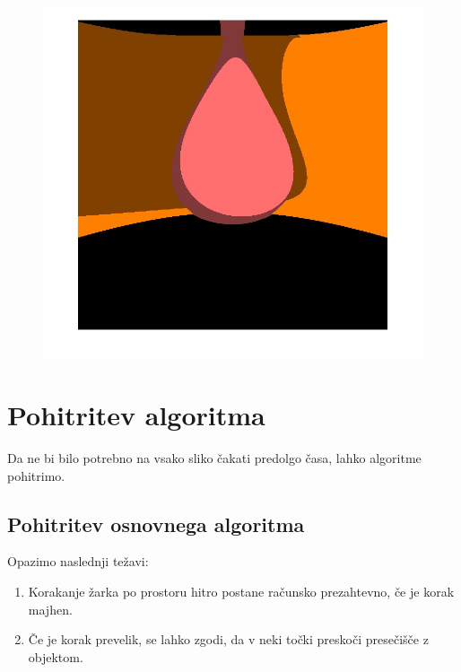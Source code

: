 \documentclass[titlepage]{article}
\begin{document}
\begin{figure}[H]
\begin{minipage}[t]{.33\textwidth}
  \label{fig:Flat torus render}
\end{minipage}
\begin{minipage}[t]{.33\textwidth}
  \centering
  \includegraphics[width=1\linewidth]{Images/2Sphere.jpg}
  \label{fig:2Sphere render}
\end{minipage}
\end{figure}


\newpage
\section{Pohitritev algoritma}
Da ne bi bilo potrebno na vsako sliko čakati predolgo časa, lahko algoritme pohitrimo. 

\subsection{Pohitritev osnovnega algoritma}
\label{subsec:pohitren_algoritem}
Opazimo naslednji težavi: 
\begin{enumerate}
  \item Korakanje žarka po prostoru hitro postane računsko prezahtevno, če je korak majhen.
  \item Če je korak prevelik, se lahko zgodi, da v neki točki preskoči presečišče z objektom.
\end{enumerate}
\end{document}
